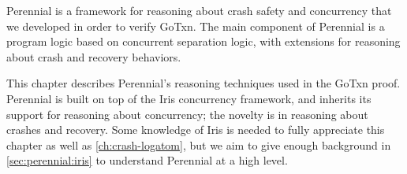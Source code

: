 Perennial is a framework for reasoning about crash safety and concurrency that
we developed in order to verify GoTxn. The main component of Perennial is a
program logic based on concurrent separation logic, with extensions for
reasoning about crash and recovery behaviors.

This chapter describes Perennial's reasoning techniques used in the GoTxn proof.
Perennial is built on top of the Iris concurrency framework, and inherits its
support for reasoning about concurrency; the novelty is in reasoning about
crashes and recovery. Some knowledge of Iris is needed to fully appreciate this
chapter as well as \cref{ch:crash-logatom}, but we aim to give enough background
in \cref{sec:perennial:iris} to understand Perennial at a high level.



